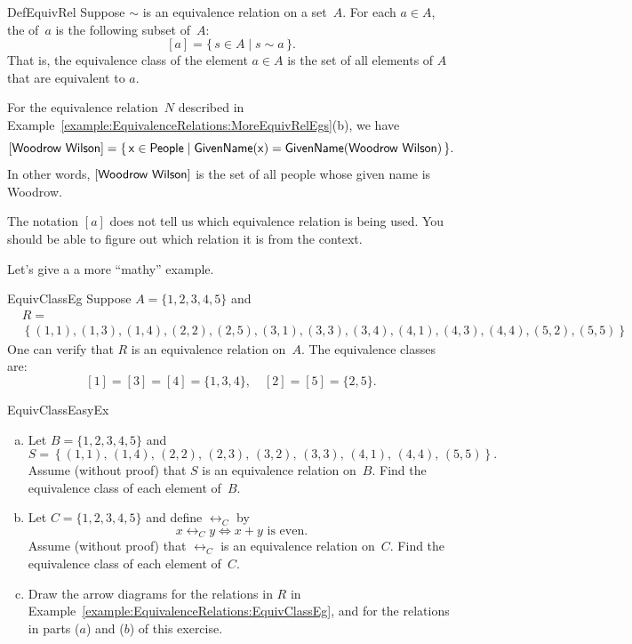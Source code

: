  \begin{defn}{DefEquivRel}
 Suppose $\sim$ is an equivalence relation on a set~$A$. For each $a \in A$, the  of~$a$ is the following subset of~$A$:
 	$$ [a] = \{\, s \in A \mid s \sim a \,\} .$$
That is, the equivalence class of the element $a \in A$ is the set of all elements of $A$ that are equivalent to $a$.
\end{defn}


\begin{example}{}
For the equivalence relation~$N$ described in Example~\ref{example:EquivalenceRelations:MoreEquivRelEgs}(b), we have
	$$ [\sf{Woodrow\,\,Wilson}] = \{\, x \in \sf{People} \mid \sf{GivenName}(x) = \sf{GivenName}(\sf{Woodrow\,\,Wilson}) \,\} .$$
In other words, $[\sf{Woodrow\,\,Wilson}]$ is the set of all people whose given name is Woodrow.
\end{example}

\begin{warn}
The notation $[a]$ does not tell us which equivalence relation is being used. You should be able to figure out which relation it is from the context.
\end{warn}

Let's give a a more ``mathy'' example.

\begin{example}{EquivClassEg}
Suppose $A = \{1,2,3,4,5\}$ and 
\begin{align*}
&R = \\
&\left\{  (1,1), (1,3), (1,4), (2,2), (2,5), (3,1), (3,3), 
		(3,4), (4,1), (4,3), (4,4), (5,2), (5,5) 
\right\}
\end{align*}
One can verify that $R$ is an equivalence relation on~$A$. The equivalence classes are:
$$ [1] = [3] = [4] = \{1,3,4\},
\quad [2] = [5] = \{2,5\}.$$
\end{example}

\begin{exercise}{EquivClassEasyEx}
\begin{enumerate}[(a)]
\item \label{EquivClassEasyEx-set}
Let $B = \{1,2,3,4,5\}$ and 
	$$S = \left\{ (1,1),\, (1,4),\, (2,2),\, (2,3),\, (3,2),\, 
		(3,3),\, (4,1),\, (4,4),\, (5,5)
		 \right\} .$$
Assume (without proof) that $S$ is an equivalence relation on~$B$. Find the equivalence class of each element of~$B$.


\item \label{EquivClassEasyEx-x+y}
Let $C = \{1,2,3,4,5\}$ and define $\rel_C$ by 
\[ x \rel_C y \iff x + y \text{ is even.} \]
Assume (without proof) that $\rel_C$ is an equivalence relation on~$C$. Find the equivalence class of each element of~$C$.
\item
Draw the arrow diagrams for the relations in $R$ in Example~\ref{example:EquivalenceRelations:EquivClassEg}, and for the relations in parts ($a$) and ($b$) of this exercise.
\end{enumerate}
\end{exercise}


